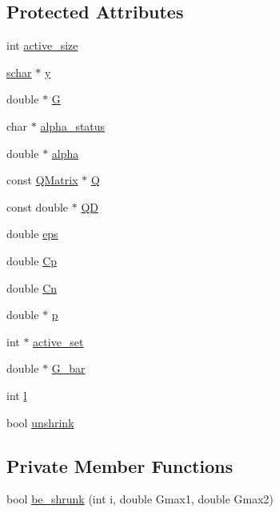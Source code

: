 \subsection*{Protected Attributes}
\begin{DoxyCompactItemize}
\item 
int \hyperlink{classSolver_a06ba1b87b3749cc545e573151b7beca0}{active\+\_\+size}
\item 
\hyperlink{svm__core_8cpp_a0fd9ce9d735064461bebfe6037026093}{schar} $\ast$ \hyperlink{classSolver_a3acc1043d06dedf87f054ff3eea5c426}{y}
\item 
double $\ast$ \hyperlink{classSolver_ad8ab27068f2e045591970aae1201afe9}{G}
\item 
char $\ast$ \hyperlink{classSolver_a9fe653e04c43956d5fb86635651b0003}{alpha\+\_\+status}
\item 
double $\ast$ \hyperlink{classSolver_a00d7a7cefa2504d41c7db6cd7cc6b428}{alpha}
\item 
const \hyperlink{classQMatrix}{Q\+Matrix} $\ast$ \hyperlink{classSolver_a2d3461718f0570bdc47f5dfb31d61e0a}{Q}
\item 
const double $\ast$ \hyperlink{classSolver_a7c7b7b1207983543855165e8eb249f2a}{QD}
\item 
double \hyperlink{classSolver_a718333cc2c1d40abf9c292a788cba1e5}{eps}
\item 
double \hyperlink{classSolver_a2e45dbea8be469bf8247e14768549dd5}{Cp}
\item 
double \hyperlink{classSolver_a38d741d194839fb445f982dd78e0b97b}{Cn}
\item 
double $\ast$ \hyperlink{classSolver_a882cce072f56679880d409e3e73f7ae8}{p}
\item 
int $\ast$ \hyperlink{classSolver_a6382277606a9b3df3d2f0ac947e1cde3}{active\+\_\+set}
\item 
double $\ast$ \hyperlink{classSolver_a89e58cf39a0415c9032b8ec2f4575dcc}{G\+\_\+bar}
\item 
int \hyperlink{classSolver_a88832d45b6de977b1cbb2afd4c0e494c}{l}
\item 
bool \hyperlink{classSolver_a62ded1c184aeb28f8dee04eb4a10530a}{unshrink}
\end{DoxyCompactItemize}
\subsection*{Private Member Functions}
\begin{DoxyCompactItemize}
\item 
bool \hyperlink{classSolver_a7f4c3abc7cad2864d85bbe41e4d7da03}{be\+\_\+shrunk} (int i, double Gmax1, double Gmax2)
\end{DoxyCompactItemize}


